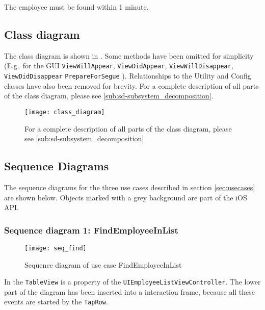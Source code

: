 \usecaseline

\begin{description}[style=multiline,leftmargin=4cm,font=\normalfont]
    \item[\emph{Quality requirements}]
  The employee must be found within 1 minute.
\end{description}

\usecasethickline

\bigskip

\subsection{Class diagram}
The class diagram is shown in . Some methods have been omitted for simplicity
(E.g.\ for the GUI \texttt{ViewWillAppear}, \texttt{ViewDidAppear}, \texttt{ViewWillDisappear}, \texttt{ViewDidDisappear} \texttt{PrepareForSegue} \@).
Relationships to the Utility and Config classes have also been removed for brevity. For a complete description
of all parts of the class diagram, please see \autoref{sub:sd-subsystem_decomposition}.

\begin{sidewaysfigure}
    \texttt{[image: class\_diagram]}
    \caption{For a complete description of all parts of the class diagram,
        please see \autoref{sub:sd-subsystem_decomposition}}
    \label{fig:decomp-class_diagram}
\end{sidewaysfigure}

\newpage
\subsection{Sequence Diagrams}

The sequence diagrams for the three use cases described in section \ref{sec:usecases} are shown below. Objects marked with a grey background are part of the iOS API.

\subsubsection{Sequence diagram 1: FindEmployeeInList}

\begin{figure}[h!]
    \centerline{\texttt{[image: seq\_find]}}
    \caption{Sequence diagram of use case FindEmployeeInList}
    \label{fig:uc1}
\end{figure}

In  the \texttt{TableView} is a property of the \texttt{UIEmployeeListViewController}. The lower part of the diagram has been inserted into a interaction frame, because all these events are started by the \texttt{TapRow}.

